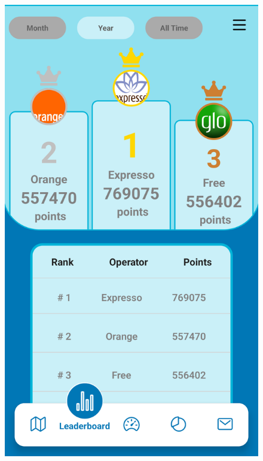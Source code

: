 \begin{figure}[H]
\begin{minipage}{0.3\textwidth}
    \label{fig:login-form-filled}
\end{minipage}\hfill
\begin{minipage}{0.3\textwidth}
    \centering
    \includegraphics[width=\linewidth]{images/sprint3/leaderBoardModule (2).png}
    \label{fig:login-form}
\end{minipage}\hfill
\end{figure}
